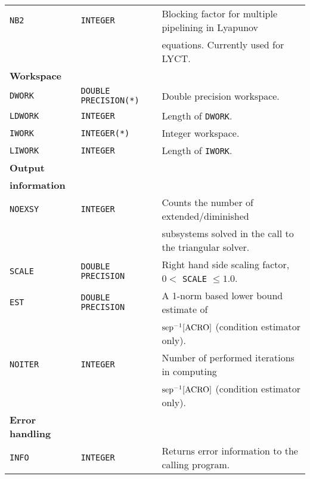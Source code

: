 \documentclass[11pt]{article}
\begin{document}
\begin{table}[!htb]
\begin{tabular}{|l|l|l|}
\texttt{NB2} & \texttt{INTEGER} & Blocking factor for multiple pipelining in Lyapunov \\
 &  &  equations. Currently used for LYCT. \\ \hline

{\bf Workspace} & & \\ \hline

\texttt{DWORK} & \texttt{DOUBLE PRECISION(*)} & Double precision workspace. \\

\texttt{LDWORK} & \texttt{INTEGER} & Length of \texttt{DWORK}. \\

\texttt{IWORK} & \texttt{INTEGER(*)} & Integer workspace. \\

\texttt{LIWORK} & \texttt{INTEGER} & Length of \texttt{IWORK}. \\
\hline

{\bf Output} & & \\
{\bf information} & & \\ \hline

\texttt{NOEXSY} & \texttt{INTEGER} & Counts the number of extended/diminished \\
                &                  & subsystems solved in the call to the triangular solver. \\

\texttt{SCALE} & \texttt{DOUBLE PRECISION} &  Right hand side scaling factor, $0<$ \texttt{SCALE} $\leq 1.0$. \\

\texttt{EST} & \texttt{DOUBLE PRECISION} & A 1-norm based lower bound estimate of \\
                &                        & ${\rm sep}^{-1}{\rm [ACRO]}$ (condition estimator only). \\

\texttt{NOITER} & \texttt{INTEGER} &  Number of performed iterations in computing \\
                &                  & ${\rm sep}^{-1}{\rm [ACRO]}$ (condition estimator only). \\
\hline

{\bf Error handling} & & \\ \hline

\texttt{INFO} & \texttt{INTEGER} & Returns error information to
the calling program. \\ \hline

\end{tabular}
\label{tab:parameters}
\end{table}
%
\end{document}
